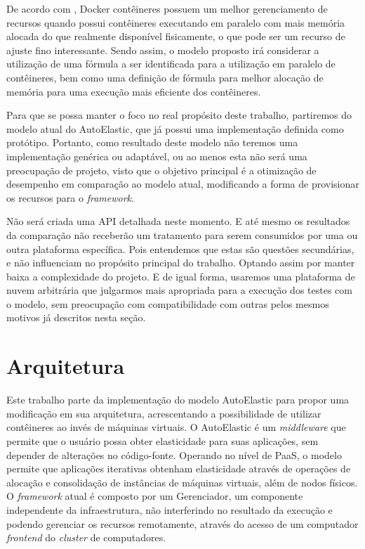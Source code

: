 \documentclass[twoside,english,brazilian]{UNISINOSartigo}
\begin{document}
\begin{itemize}
De acordo com , Docker contêineres possuem um melhor gerenciamento de recursos quando possui contêineres executando em paralelo com mais memória alocada do que realmente disponível fisicamente, o que pode ser um recurso de ajuste fino interessante. Sendo assim, o modelo proposto irá considerar a utilização de uma fórmula a ser identificada para a utilização em paralelo de contêineres, bem como uma definição de fórmula para melhor alocação de memória para uma execução mais eficiente dos contêineres.

Para que se possa manter o foco no real propósito deste trabalho, partiremos do modelo atual do AutoElastic, que já possui uma implementação definida como protótipo. Portanto, como resultado deste modelo não teremos uma implementação genérica ou adaptável, ou ao menos esta não será uma preocupação de projeto, visto que o objetivo principal é a otimização de desempenho em comparação ao modelo atual, modificando a forma de provisionar os recursos para o \textit{framework}. 

Não será criada uma API detalhada neste momento. E até mesmo os resultados da comparação não receberão um tratamento para serem consumidos por uma ou outra plataforma específica. Pois entendemos que estas são questões secundárias, e não influenciam no propósito principal do trabalho. Optando assim por manter baixa a complexidade do projeto. E de igual forma, usaremos uma plataforma de nuvem arbitrária que julgarmos mais apropriada para a execução dos testes com o modelo, sem preocupação com compatibilidade com outras pelos mesmos motivos já descritos nesta seção.

\section{Arquitetura}
\label{arquitetura}

Este trabalho parte da implementação do modelo AutoElastic para propor uma modificação em sua arquitetura, acrescentando a possibilidade de utilizar contêineres ao invés de máquinas virtuais. O AutoElastic é um \textit{middleware} que permite que o usuário possa obter elasticidade para suas aplicações, sem depender de alterações no código-fonte. Operando no nível de PaaS, o modelo permite que aplicações iterativas obtenham elasticidade através de operações de alocação e consolidação de instâncias de máquinas virtuais, além de nodos físicos. O \textit{framework} atual é composto por um Gerenciador, um componente independente da infraestrutura, não interferindo no resultado da execução e podendo gerenciar os recursos remotamente, através do acesso de um computador \textit{frontend} do \textit{cluster} de computadores.


\end{itemize}
\end{document}

